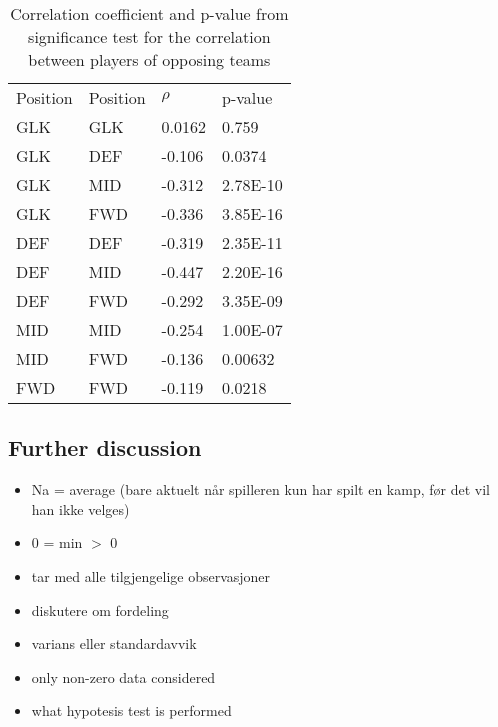 \begin{table}[H]
\centering
\caption{Correlation coefficient and p-value from significance test for the correlation between players of opposing teams}
\label{tab:cor_opp}
\begin{tabular}{llll}
Position & Position & $\rho$    & p-value  \\
GLK      & GLK      & 0.0162 & 0.759    \\
GLK      & DEF      & -0.106 & 0.0374   \\
GLK      & MID      & -0.312 & 2.78E-10 \\
GLK      & FWD      & -0.336 & 3.85E-16 \\
DEF      & DEF      & -0.319 & 2.35E-11 \\
DEF      & MID      & -0.447 & 2.20E-16 \\
DEF      & FWD      & -0.292 & 3.35E-09 \\
MID      & MID      & -0.254 & 1.00E-07 \\
MID      & FWD      & -0.136 & 0.00632 \\
FWD      & FWD      & -0.119 & 0.0218  
\end{tabular}
\end{table}

\subsection{Further discussion}
\begin{itemize}
    \item Na = average (bare aktuelt når spilleren kun har spilt en kamp, før det vil han ikke velges) 
    \item 0 = min $>$ 0
    \item tar med alle tilgjengelige observasjoner
    \item diskutere om fordeling
    \item varians eller standardavvik
    \item only non-zero data considered
    \item what hypotesis test is performed
\end{itemize}












